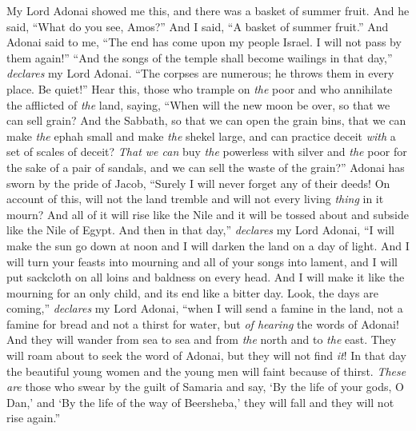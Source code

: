 \begin{biblechapter} %
 My Lord Adonai showed me this, and there was a basket of summer fruit.
\verse And he said, “What do you see, Amos?” And I said, “A basket of summer fruit.” And Adonai said to me, “The end has come upon my people Israel. I will not pass by them again!”
\verse “And the songs of the temple shall become wailings in that day,” \textit{declares} my Lord Adonai. “The corpses are numerous; he throws them in every place. Be quiet!”
\verse Hear this, those who trample on \textit{the} poor and who annihilate the afflicted of \textit{the} land,
\verse saying, “When will the new moon be over, so that we can sell grain? And the Sabbath, so that we can open the grain bins, that we can make \textit{the} ephah small and make \textit{the} shekel large, and can practice deceit \textit{with} a set of scales of deceit?
\verse \textit{That we can} buy \textit{the} powerless with silver and \textit{the} poor for the sake of a pair of sandals, and we can sell the waste of the grain?”
\verse Adonai has sworn by the pride of Jacob, “Surely I will never forget any of their deeds!
\verse On account of this, will not the land tremble and will not every living \textit{thing} in it mourn? And all of it will rise like the Nile and it will be tossed about and subside like the Nile of Egypt.
\verse And then in that day,” \textit{declares} my Lord Adonai, “I will make the sun go down at noon and I will darken the land on a day of light.
\verse And I will turn your feasts into mourning and all of your songs into lament, and I will put sackcloth on all loins and baldness on every head. And I will make it like the mourning for an only child, and its end like a bitter day.
\verse Look, the days are coming,” \textit{declares} my Lord Adonai, “when I will send a famine in the land, not a famine for bread and not a thirst for water, but \textit{of hearing} the words of Adonai!
\verse And they will wander from sea to sea and from \textit{the} north and to \textit{the} east. They will roam about to seek the word of Adonai, but they will not find \textit{it}!
\verse In that day the beautiful young women and the young men will faint because of thirst.
\verse \textit{These are} those who swear by the guilt of Samaria and say, ‘By the life of your gods, O Dan,’ and ‘By the life of the way of Beersheba,’ they will fall and they will not rise again.”
\end{biblechapter}

